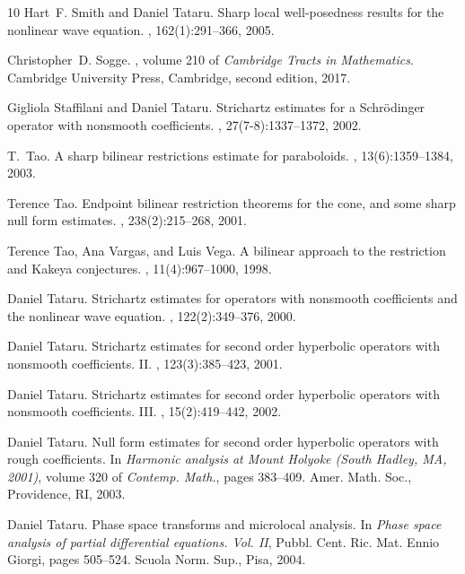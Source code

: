 \documentclass{amsart}
\theoremstyle{definition}
\begin{document}
\begin{thebibliography}{10}
Hart~F. Smith and Daniel Tataru.
\newblock Sharp local well-posedness results for the nonlinear wave equation.
, 162(1):291--366, 2005.

Christopher~D. Sogge.
, volume 210 of {\em
  Cambridge Tracts in Mathematics}.
\newblock Cambridge University Press, Cambridge, second edition, 2017.

Gigliola Staffilani and Daniel Tataru.
\newblock Strichartz estimates for a {S}chr\"odinger operator with nonsmooth
  coefficients.
, 27(7-8):1337--1372, 2002.

T.~Tao.
\newblock A sharp bilinear restrictions estimate for paraboloids.
, 13(6):1359--1384, 2003.

Terence Tao.
\newblock Endpoint bilinear restriction theorems for the cone, and some sharp
  null form estimates.
, 238(2):215--268, 2001.

Terence Tao, Ana Vargas, and Luis Vega.
\newblock A bilinear approach to the restriction and {K}akeya conjectures.
, 11(4):967--1000, 1998.

Daniel Tataru.
\newblock Strichartz estimates for operators with nonsmooth coefficients and
  the nonlinear wave equation.
, 122(2):349--376, 2000.

Daniel Tataru.
\newblock Strichartz estimates for second order hyperbolic operators with
  nonsmooth coefficients. {II}.
, 123(3):385--423, 2001.

Daniel Tataru.
\newblock Strichartz estimates for second order hyperbolic operators with
  nonsmooth coefficients. {III}.
, 15(2):419--442, 2002.

Daniel Tataru.
\newblock Null form estimates for second order hyperbolic operators with rough
  coefficients.
\newblock In {\em Harmonic analysis at {M}ount {H}olyoke ({S}outh {H}adley,
  {MA}, 2001)}, volume 320 of {\em Contemp. Math.}, pages 383--409. Amer. Math.
  Soc., Providence, RI, 2003.

Daniel Tataru.
\newblock Phase space transforms and microlocal analysis.
\newblock In {\em Phase space analysis of partial differential equations.
  {V}ol. {II}}, Pubbl. Cent. Ric. Mat. Ennio Giorgi, pages 505--524. Scuola
  Norm. Sup., Pisa, 2004.


\end{thebibliography}
\end{document}
